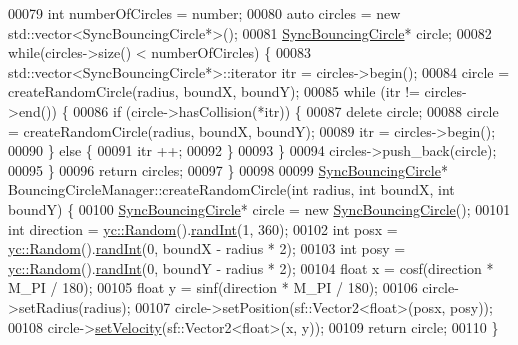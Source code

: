 \begin{DoxyCode}
00079     \textcolor{keywordtype}{int} numberOfCircles = number;
00080     \textcolor{keyword}{auto} circles = \textcolor{keyword}{new} std::vector<SyncBouncingCircle*>();
00081     \hyperlink{class_sync_bouncing_circle}{SyncBouncingCircle}* circle;
00082     \textcolor{keywordflow}{while}(circles->size() < numberOfCircles) \{
00083         std::vector<SyncBouncingCircle*>::iterator itr = circles->begin();
00084         circle = createRandomCircle(radius, boundX, boundY);
00085         \textcolor{keywordflow}{while} (itr != circles->end()) \{
00086             \textcolor{keywordflow}{if} (circle->hasCollision(*itr)) \{
00087                 \textcolor{keyword}{delete} circle;
00088                 circle = createRandomCircle(radius, boundX, boundY);
00089                 itr = circles->begin();
00090             \} \textcolor{keywordflow}{else} \{
00091                 itr ++;
00092             \}
00093         \}
00094         circles->push\_back(circle);
00095     \}
00096     \textcolor{keywordflow}{return} circles;
00097 \}
00098 
00099 \hyperlink{class_sync_bouncing_circle}{SyncBouncingCircle}*  BouncingCircleManager::createRandomCircle(\textcolor{keywordtype}{int} radius, \textcolor{keywordtype}{int} boundX, \textcolor{keywordtype}{
      int} boundY) \{
00100     \hyperlink{class_sync_bouncing_circle}{SyncBouncingCircle}* circle = \textcolor{keyword}{new} \hyperlink{class_sync_bouncing_circle}{SyncBouncingCircle}();
00101     \textcolor{keywordtype}{int} direction = \hyperlink{classyc_1_1_random}{yc::Random}().\hyperlink{classyc_1_1_random_a8cf4d84430a8a030f93078d439d819b8}{randInt}(1, 360);
00102     \textcolor{keywordtype}{int} posx = \hyperlink{classyc_1_1_random}{yc::Random}().\hyperlink{classyc_1_1_random_a8cf4d84430a8a030f93078d439d819b8}{randInt}(0, boundX - radius * 2);
00103     \textcolor{keywordtype}{int} posy = \hyperlink{classyc_1_1_random}{yc::Random}().\hyperlink{classyc_1_1_random_a8cf4d84430a8a030f93078d439d819b8}{randInt}(0, boundY - radius * 2);
00104     \textcolor{keywordtype}{float} x = cosf(direction * M\_PI / 180);
00105     \textcolor{keywordtype}{float} y = sinf(direction * M\_PI / 180);
00106     circle->setRadius(radius);
00107     circle->setPosition(sf::Vector2<float>(posx, posy));
00108     circle->\hyperlink{class_sync_bouncing_circle_a1e732f9061d50b87b227f7b57b3834bd}{setVelocity}(sf::Vector2<float>(x, y));
00109     \textcolor{keywordflow}{return} circle;
00110 \}
\end{DoxyCode}

